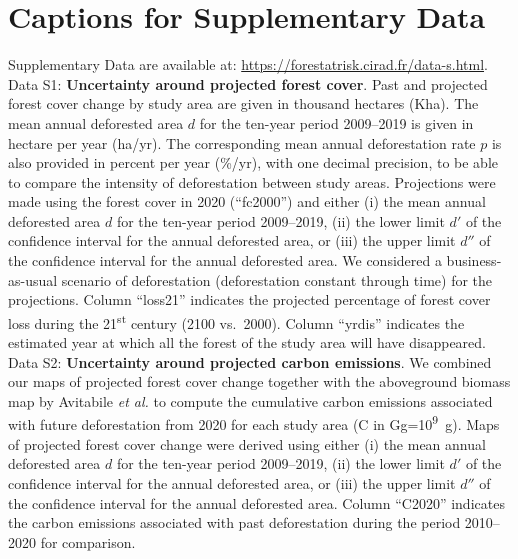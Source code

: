\documentclass[
  12pt,
]{article}
\begin{document}
\newpage

\hypertarget{captions-for-supplementary-data}{%
\section{Captions for Supplementary Data}\label{captions-for-supplementary-data}}

Supplementary Data are available at: \url{https://forestatrisk.cirad.fr/data-s.html}.\\

\noindent Data S1: \textbf{Uncertainty around projected forest cover}. Past and projected forest cover change by study area are given in thousand hectares (Kha). The mean annual deforested area \(d\) for the ten-year period 2009--2019 is given in hectare per year (ha/yr). The corresponding mean annual deforestation rate \(p\) is also provided in percent per year (\%/yr), with one decimal precision, to be able to compare the intensity of deforestation between study areas. Projections were made using the forest cover in 2020 (``fc2000'') and either (i) the mean annual deforested area \(d\) for the ten-year period 2009--2019, (ii) the lower limit \(d'\) of the confidence interval for the annual deforested area, or (iii) the upper limit \(d''\) of the confidence interval for the annual deforested area. We considered a business-as-usual scenario of deforestation (deforestation constant through time) for the projections. Column ``loss21'' indicates the projected percentage of forest cover loss during the 21\textsuperscript{st} century (2100 vs.~2000). Column ``yrdis'' indicates the estimated year at which all the forest of the study area will have disappeared.\\

\noindent Data S2: \textbf{Uncertainty around projected carbon emissions}. We combined our maps of projected forest cover change together with the aboveground biomass map by Avitabile \emph{et al.} \citep{Avitabile2016} to compute the cumulative carbon emissions associated with future deforestation from 2020 for each study area (C in Gg=10\textsuperscript{9}~g). Maps of projected forest cover change were derived using either (i) the mean annual deforested area \(d\) for the ten-year period 2009--2019, (ii) the lower limit \(d'\) of the confidence interval for the annual deforested area, or (iii) the upper limit \(d''\) of the confidence interval for the annual deforested area. Column ``C2020'' indicates the carbon emissions associated with past deforestation during the period 2010--2020 for comparison.
\end{document}
